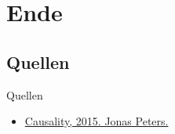 \section{Ende}
\subsection{Quellen}
\begin{frame}{Quellen}
    \begin{itemize}
        \item \href{https://stat.ethz.ch/people/jopeters/index/edit/causalityHomepage/causality_files/scriptChapter1-4.pdf}{Causality, 2015. Jonas Peters.}
    \end{itemize}
\end{frame}